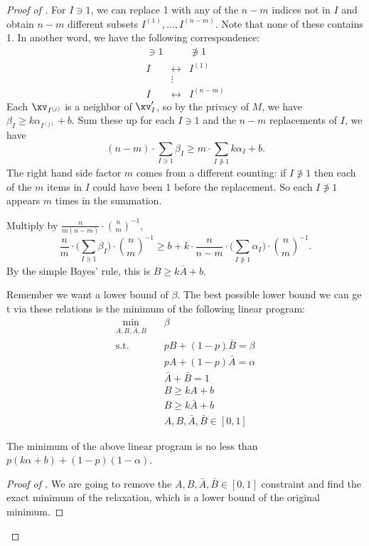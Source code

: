\begin{proof}[Proof of ]
	For $I\ni1$, we can replace 1 with any of the $n-m$ indices not in $I$ and obtain $n-m$ different subsets $I^{(1)},\ldots, I^{(n-m)}$. Note that none of these contains 1. In another word, we have the following correspondence:
	\[
		\begin{array}{ccc}
			\ni 1 &  & \not\ni1 \\
			I & \longleftrightarrow & I^{(1)} \\
			& \vdots &\\
			I & \longleftrightarrow & I^{(n-m)}
		\end{array}
	\]
	Each $\xv_{I^{(j)}}$ is a neighbor of $\xv'_I$, so by the privacy of $M$, we have $\beta_I\geqslant k\alpha_{I^{(j)}}+b$. Sum these up for each $I\ni1$ and the $n-m$ replacements of $I$, we have
	\[(n-m)\cdot\sum_{I\ni 1} \beta_I\geqslant m\cdot\sum_{I\not\ni 1} k\alpha_I+b.\]
	The right hand side factor $m$ comes from a different counting: if $I\not\ni1$ then each of the $m$ items in $I$ could have been 1 before the replacement. So each $I\not\ni1$ appears $m$ times in the summation.

	Multiply by $\frac{n}{m(n-m)}\cdot\binom{n}{m}^{-1}$,
	\[\frac{n}{m}\cdot\bigg(\sum_{I\ni 1} \beta_I\bigg)\cdot \binom{n}{m}^{-1}\geqslant b+ k \cdot \frac{n}{n-m}\cdot\bigg(\sum_{I\not\ni 1} \alpha_I\bigg)\cdot \binom{n}{m}^{-1}.\]
	By the simple Bayes' rule, this is $B\geqslant k\bar{A}+b$.

	Remember we want a lower bound of $\beta$. The best possible lower bound we can ge t via these relations is the minimum of the following linear program:
	\begin{align*}
		\min_{A,B,\bar{A},\bar{B}} \quad & \beta\\
		\textrm{s.t.}\quad
		& pB+(1-p)\bar{B}=\beta\\
		& pA+(1-p)\bar{A}=\alpha\\
		& \bar{A}+\bar{B} = 1 \\
		& B\geqslant kA+b\\
		& B\geqslant k\bar{A}+b \\
		& A,B,\bar{A},\bar{B}\in [0,1]
	\end{align*}
	\begin{lemma} \label{lem:LP}
		The minimum of the above linear program is no less than $p(k\alpha+b)+(1-p)(1-\alpha)$.
	\end{lemma}
	\begin{proof}[Proof of ]
		We are going to remove the $A,B,\bar{A},\bar{B}\in [0,1]$ constraint and find the exact minimum of the relaxation, which is a lower bound of the original minimum.


\end{proof}
\end{proof}
